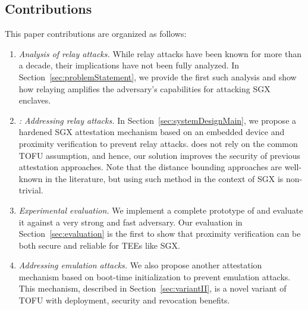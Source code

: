 \subsection{Contributions} This paper contributions are organized as follows:

\begin{enumerate}
    \item \emph{Analysis of relay attacks.} While relay attacks have been known for more than a decade, their implications have not been fully analyzed. In Section~\ref{sec:problemStatement}, we provide the first such analysis and show how relaying amplifies the adversary's capabilities for attacking SGX enclaves.   

    \item \emph{\name: Addressing relay attacks.} In Section~\ref{sec:systemDesignMain}, we propose a hardened SGX attestation mechanism based on an embedded device and proximity verification to prevent relay attacks. \name does not rely on the common TOFU assumption, and hence, our solution improves the security of previous attestation approaches. Note that the distance bounding approaches are well-known in the literature, but using such method in the context of SGX is non-trivial.
    
    \item \emph{Experimental evaluation.} We implement a complete prototype of \name and evaluate it against a very strong and fast adversary. Our evaluation in Section~\ref{sec:evaluation} is the first to show that proximity verification can be both secure and reliable for TEEs like SGX.
    
    \item \emph{Addressing emulation attacks.} We also propose another attestation mechanism based on boot-time initialization to prevent emulation attacks. This mechanism, described in Section~\ref{sec:variantII}, is a novel variant of TOFU with deployment, security and revocation benefits.
\end{enumerate}


